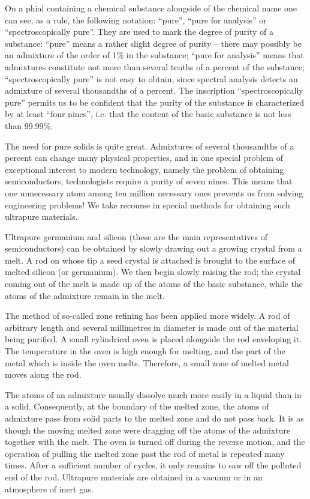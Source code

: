 On a phial containing a chemical substance alongside of the chemical name one can see, as a rule, the following notation: ``pure'', ``pure for analysis'' or ``spectroscopically pure''. They are used to mark the degree of purity of a substance: ``pure'' means a rather slight degree of purity -- there may possibly be an admixture of the order of 1\% in the substance; ``pure for analysis'' means that admixtures constitute not more than several tenths of a percent of the substance; ``spectroscopically pure'' is not easy to obtain, since spectral analysis detects an admixture of several thousandths of a percent. The inscription ``spectroscopically pure'' permits us to be confident that the purity of the substance is characterized by at least ``four nines'', i.e. that the content of the basic substance is not less than 99.99\%.

The need for pure solids is quite great. Admixtures of several thousandths of a percent can change many phys­ical properties, and in one special problem of exception­al interest to modern technology, namely the problem of obtaining semiconductors, technologists require a purity of seven nines. This means that one unnecessary atom among ten million necessary ones prevents us from solv­ing engineering problems! We take recourse in special methods for obtaining such ultrapure materials.

Ultrapure germanium and silicon (these are the main representatives of semiconductors) can be obtained by slowly drawing out a growing crystal from a melt. A rod on whose tip a seed crystal is attached is brought to the surface of melted silicon (or germanium). We then begin slowly raising the rod; the crystal coming out of the melt is made up of the atoms of the basic substance, while the atoms of the admixture remain in the melt.

The method of so-called zone refining has been applied more widely. A rod of arbitrary length and several mil­limetres in diameter is made out of the material being purified. A small cylindrical oven is placed alongside the rod enveloping it. The temperature in the oven is high enough for melting, and the part of the metal which is inside the oven melts. Therefore, a small zone of melted metal moves along the rod.

The atoms of an admixture usually dissolve much more easily in a liquid than in a solid. Consequently, at the boundary of the melted zone, the atoms of admixture pass from solid parts to the melted zone and do not pass back. It is as though the moving melted zone were dragging off the atoms of the admixture together with the melt. The oven is turned off during the reverse motion, and the operation of pulling the melted zone past the rod of metal is repeated many times. After a sufficient number of cycles, it only remains to saw off the polluted end of the rod. Ultrapure materials are obtained in a vacuum or in an atmosphere of inert gas.

